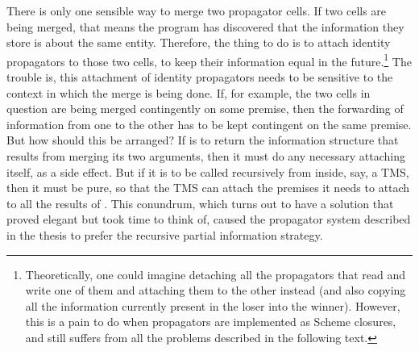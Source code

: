 \documentclass[12pt,letterpaper]{article}
\begin{document}
There is only one sensible way to merge two propagator cells.  If two
cells are being merged, that means the program has discovered that the
information they store is about the same entity.  Therefore, the thing
to do is to attach identity propagators to those two cells, to keep
their information equal in the future.\footnote{Theoretically, one
  could imagine detaching all the propagators that read and write one
  of them and attaching them to the other instead (and also copying
  all the information currently present in the loser into the winner).
  However, this is a pain to do when propagators are implemented as
  Scheme closures, and still suffers from all the problems described
  in the following text.}  The trouble is, this attachment of identity
propagators needs to be sensitive to the context in which the merge is
being done.  If, for example, the two cells in question are being
merged contingently on some premise, then the forwarding of
information from one to the other has to be kept contingent on the
same premise.  But how should this be arranged?  If  is to
return the information structure that results from merging its two
arguments, then it must do any necessary attaching itself, as a side
effect.  But if it is to be called recursively from inside, say, a
TMS, then it must be pure, so that the TMS can attach the premises it
needs to attach to all the results of .  This conundrum,
which turns out to have a solution that proved elegant but took time
to think of, caused the propagator system described in the thesis to
prefer the recursive partial information strategy.
\end{document}
